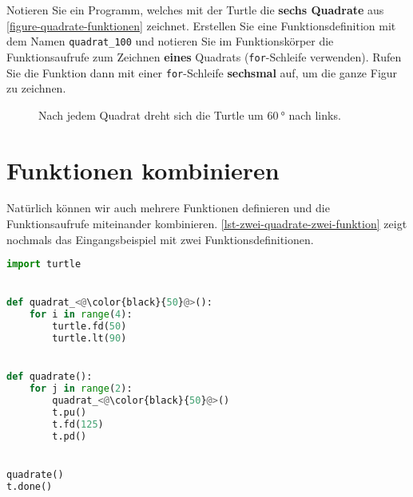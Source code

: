 Notieren Sie ein Programm, welches mit der Turtle die \textbf{sechs Quadrate} aus \autoref{figure-quadrate-funktionen} zeichnet. Erstellen Sie eine Funktionsdefinition mit dem Namen \lstinline{quadrat_100} und notieren Sie im Funktionskörper die Funktionsaufrufe zum Zeichnen \textbf{eines} Quadrats (\lstinline{for}-Schleife verwenden). Rufen Sie die Funktion dann mit einer \lstinline{for}-Schleife \textbf{sechsmal} auf, um die ganze Figur zu zeichnen.

\begin{figure}[htb]
\centering
{}
\caption{Nach jedem Quadrat dreht sich die Turtle um $\qty{60}{\degree}$ nach links.}
\label{figure-quadrate-funktionen}
\end{figure}

\vspace{-0.75cm}

\fillwithgrid{3in}

\section{Funktionen kombinieren}

Natürlich können wir auch mehrere Funktionen definieren und die Funktionsaufrufe miteinander kombinieren. \autoref{lst-zwei-quadrate-zwei-funktion} zeigt nochmals das Eingangsbeispiel mit zwei Funktionsdefinitionen.

\begin{lstlisting}[language=python, caption={Zwei Funktionsdefinitionen. In der zweiten Funktionsdefinition wird die erste Funktion durch die Schleife mehrfach aufgerufen.}, label={lst-zwei-quadrate-zwei-funktion}]
import turtle


def quadrat_<@\color{black}{50}@>():
    for i in range(4):
        turtle.fd(50)
        turtle.lt(90)


def quadrate():
    for j in range(2):
        quadrat_<@\color{black}{50}@>()
        t.pu()
        t.fd(125)
        t.pd()


quadrate()
t.done()
\end{lstlisting}